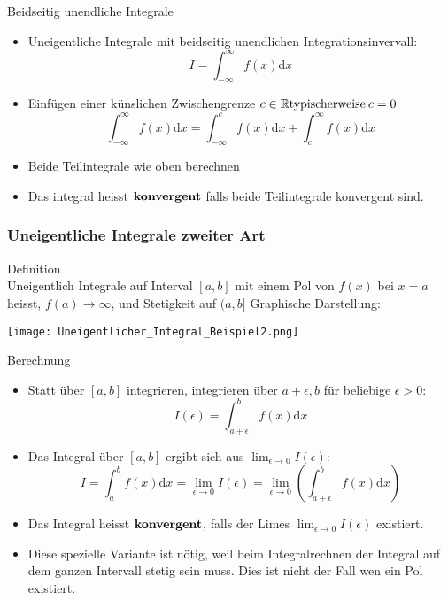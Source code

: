 \begin{KR}{Beidseitig unendliche Integrale}
\begin{itemize}
	\item Uneigentliche Integrale mit beidseitig unendlichen Integrationsinvervall:
		\[I=\int_{-\infty}^{\infty}{f(x)\mathrm{d}x}\]
	\item Einfügen einer künslichen Zwischengrenze \(c \in \mathbb{R}\\\text{typischerweise}\:c=0 \)
		\[\int_{-\infty}^{\infty}{f(x)\mathrm{d}x}=\int_{-\infty}^{c}{f(x)\mathrm{d}x}+\int_c^{\infty}
		{f(x)\mathrm{d}x} \]
	\item Beide Teilintegrale wie oben berechnen
	\item Das integral heisst \(\bold{konvergent}\) falls beide Teilintegrale konvergent sind.
\end{itemize}
\end{KR}
\subsubsection{Uneigentliche Integrale zweiter Art}
	\begin{definition}{Definition}\\
		Uneigentlich Integrale auf Interval \([a,b]\) mit einem Pol von \(f(x)\) bei \(x=a\) heisst,
		\(f(a) \rightarrow \infty\), und Stetigkeit auf \((a,b]\)
		Graphische Darstellung:
	\begin{center}
		\texttt{[image: Uneigentlicher\_Integral\_Beispiel2.png]}
	\end{center}
  \end{definition}
  \begin{KR}{Berechnung}
	  \begin{itemize}
	  	
\item Statt über \([a,b]\) integrieren, integrieren über \(a+\epsilon,b\) für beliebige \(\epsilon>0\):
	\[I(\epsilon)=\int_{a+\epsilon}^b{f(x)\mathrm{d}x}\]
\item Das Integral über \([a,b]\) ergibt sich aus \(\lim_{\epsilon \rightarrow 0}I(\epsilon)\):
	\[I=\int_a^b{f(x)\mathrm{d}x}=\underset{\epsilon \rightarrow 0}{\lim}I(\epsilon)=\underset{\epsilon \rightarrow
	0}{\lim}\left(\int_{a+\epsilon}^b{f(x)\mathrm{d}x}\right) \]
\item Das Integral heisst \(\bold{konvergent}\), falls der Limes \(\lim_{\epsilon \rightarrow 0}I(\epsilon)\) existiert.
\item Diese spezielle Variante ist nötig, weil beim Integralrechnen der Integral auf dem ganzen Intervall stetig sein
	muss. Dies ist nicht der Fall wen ein Pol existiert.
\end{itemize}
  \end{KR}



